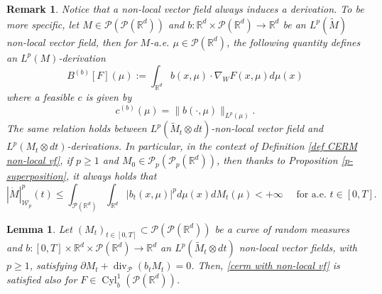 \documentclass[10pt,leqno]{amsart}
\numberwithin{equation}{section}
\newtheorem{lemma}[teorema]{Lemma}
\newtheorem{oss}[teorema]{Remark}
\newcommand{\R}{\mathbb{R}}
\newcommand{\PP}{\mathcal{P}}
\begin{document}
\begin{oss}\label{rem: vf induces deriv}
    Notice that a non-local vector field always induces a derivation. To be more specific, let $M\in \PP(\PP(\R^d))$ and $b:\R^d \times \PP(\R^d)\to\R^d$ be an $L^p(\widetilde{M})$ non-local vector field, then for $M$-a.e. $\mu\in \PP(\R^d)$, the following quantity defines an $L^p(M)$-derivation
    \begin{equation}
        B^{(b)}[F](\mu) := \int_{\R^d} b(x,\mu)\cdot \nabla_W F(x,\mu)d\mu(x)
    \end{equation}
    where a feasible $c$ is given by 
    \[c^{(b)}(\mu) = \|b(\cdot,\mu)\|_{L^p(\mu)}.\]
    The same relation holds between $L^p(\widetilde{M}_t\otimes dt)$-non-local vector field and $L^p(M_t\otimes dt)$-derivations. In particular, in the context of Definition \ref{def CERM non-local vf}, if $p\geq1$ and $M_0\in \PP_p(\PP_p(\R^d))$, then thanks to Proposition \ref{p-superposition}, it always holds that
    \begin{equation}\label{eq: energy ineq CERM nlvf}
        |\dot{M}|_{\mathcal{W}_p}^p(t) \leq \int_{\PP(\R^d)} \int_{\R^d} |b_t(x,\mu)|^pd\mu(x)dM_t(\mu) <+\infty \quad \text{ for a.e. }t\in[0,T].
    \end{equation}
\end{oss}

\begin{lemma}\label{lemma: CERM duality with cyl_b}
     Let $(M_t)_{t\in [0,T]} \subset \PP(\PP(\R^d))$ be a curve of random measures and $b:[0,T]\times \R^d \times \PP(\R^d) \to \R^d$ an $L^p(\widetilde{M}_t\otimes dt)$ non-local vector fields, with $p\geq 1$, satisfying $\partial M_t + \operatorname{div}_\PP(b_tM_t) = 0$. Then, \eqref{cerm with non-local vf} is satisfied also for $F \in \operatorname{Cyl}_b^1(\PP(\R^d))$.
\end{lemma}
\end{document}
